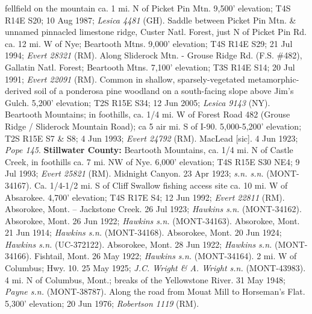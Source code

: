 fellfield on the mountain ca. 1 mi. N of Picket Pin Mtn. 9,500’ elevation; T4S R14E S20; 10 Aug 1987; \textit{Lesica 4481} (GH).  Saddle between Picket Pin Mtn. \& unnamed pinnacled limestone ridge, Custer Natl. Forest, just N of Picket Pin Rd. ca. 12 mi. W of Nye; Beartooth Mtns. 9,000’ elevation; T4S R14E S29; 21 Jul 1994; \textit{Evert 28321} (RM).  Along Sliderock Mtn. - Grouse Ridge Rd. (F.S. \#482), Gallatin Natl. Forest; Beartooth Mtns. 7,100’ elevation; T3S R14E S14; 20 Jul 1991; \textit{Evert 22091} (RM).  Common in shallow, sparsely-vegetated metamorphic-derived soil of a ponderosa pine woodland on a south-facing slope above Jim's Gulch. 5,200’ elevation; T2S R15E S34; 12 Jun 2005; \textit{Lesica 9143} (NY).  Beartooth Mountains; in foothills, ca. 1/4 mi. W of Forest Road 482 (Grouse Ridge / Sliderock Mountain Road); ca 5 air mi. S of I-90. 5,000-5,200’ elevation; T2S R15E S7 \& S8; 4 Jun 1993; \textit{Evert 24792} (RM).  MacLead [sic]. 4 Jun 1923; \textit{Pope 145}.  \textbf{Stillwater County:}  Beartooth Mountains, ca. 1/4 mi. N of Castle Creek, in foothills ca. 7 mi. NW of Nye. 6,000’ elevation; T4S R15E S30 NE4; 9 Jul 1993; \textit{Evert 25821} (RM).  Midnight Canyon. 23 Apr 1923; \textit{s.n. s.n.} (MONT-34167).  Ca. 1/4-1/2 mi. S of Cliff Swallow fishing access site ca. 10 mi. W of Absarokee. 4,700’ elevation; T4S R17E S4; 12 Jun 1992; \textit{Evert 22811} (RM).  Absorokee, Mont. – Jackstone Creek. 26 Jul 1923; \textit{Hawkins s.n.} (MONT-34162).  Absorokee, Mont. 26 Jun 1922; \textit{Hawkins s.n.} (MONT-34163).  Absorokee, Mont. 21 Jun 1914; \textit{Hawkins s.n.} (MONT-34168).  Absorokee, Mont.  20 Jun 1924; \textit{Hawkins s.n.} (UC-372122).  Absorokee, Mont. 28 Jun 1922; \textit{Hawkins s.n.} (MONT-34166).  Fishtail, Mont. 26 May 1922; \textit{Hawkins s.n.} (MONT-34164).  2 mi. W of Columbus; Hwy. 10. 25 May 1925; \textit{J.C. Wright \& A. Wright s.n.} (MONT-43983).  4 mi. N of Columbus, Mont.; breaks of the Yellowstone River. 31 May 1948; \textit{Payne s.n.} (MONT-38787).  Along the road from Mouat Mill to Horseman’s Flat. 5,300’ elevation; 20 Jun 1976; \textit{Robertson 1119} (RM).  
